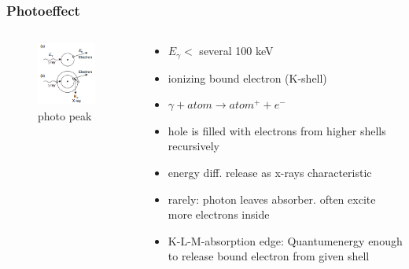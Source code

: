 \documentclass[aspectratio=1610, 12pt]{beamer}
\begin{document}
\begin{frame}\frametitle{Photoeffect}
  \begin{columns}
    \begin{column}[c]{0.48\textwidth}
      \begin{figure}
        \includegraphics[width=0.9\textwidth]{plots/photo_abs.png}
        \caption{photo peak}
      \end{figure}
    \end{column}
    \begin{column}[c]{0.48\textwidth}
      \begin{itemize}
        \item $E_\gamma < $ several 100 keV
        \item ionizing bound electron (K-shell)
        \item $\gamma + atom \to atom^{+} + e^{-}$
        \item hole is filled with electrons from higher shells recursively
        \item energy diff. release as x-rays characteristic
        \item rarely: photon leaves absorber. often excite more electrons inside
        \item K-L-M-absorption edge: Quantumenergy enough to release bound electron from given shell
      \end{itemize}
    \end{column}
  \end{columns}
\end{frame}
\end{document}
